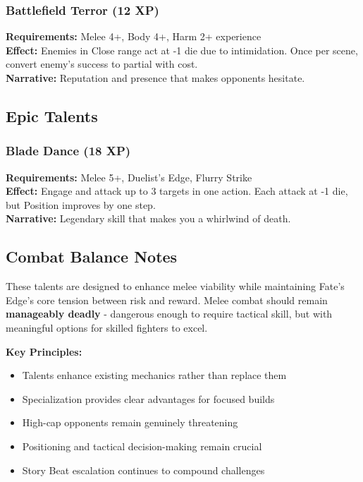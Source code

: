 \subsubsection{Battlefield Terror (12 XP)}
\textbf{Requirements:} Melee 4+, Body 4+, Harm 2+ experience \\
\textbf{Effect:} Enemies in Close range act at -1 die due to intimidation. Once per scene, convert enemy's success to partial with cost. \\
\textbf{Narrative:} Reputation and presence that makes opponents hesitate.

\subsection{Epic Talents}

\subsubsection{Blade Dance (18 XP)}
\textbf{Requirements:} Melee 5+, Duelist's Edge, Flurry Strike \\
\textbf{Effect:} Engage and attack up to 3 targets in one action. Each attack at -1 die, but Position improves by one step. \\
\textbf{Narrative:} Legendary skill that makes you a whirlwind of death.

\subsection{Combat Balance Notes}

These talents are designed to enhance melee viability while maintaining Fate's Edge's core tension between risk and reward. Melee combat should remain \textbf{manageably deadly} - dangerous enough to require tactical skill, but with meaningful options for skilled fighters to excel.

\textbf{Key Principles:}
\begin{itemize}
    \item Talents enhance existing mechanics rather than replace them
    \item Specialization provides clear advantages for focused builds
    \item High-cap opponents remain genuinely threatening
    \item Positioning and tactical decision-making remain crucial
    \item Story Beat escalation continues to compound challenges
\end{itemize}

